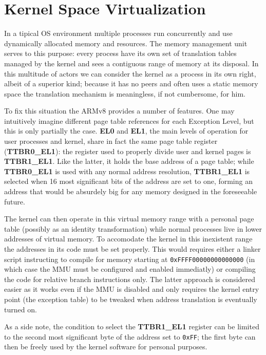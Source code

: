 \documentclass[12pt,a4paper,openright,twoside]{report}
\begin{document}
\section{Kernel Space Virtualization}
\label{kernelvirt}
In a tipical OS environment multiple processes run concurrently and use dynamically
allocated memory and resources. The memory management unit serves to this purpose:
every process have its own set of translation tables managed by the kernel and sees a 
contiguous range of memory at its disposal. In this multitude of actors we can
consider the kernel as a process in its own right, albeit of a superior kind; because
it has no peers and often uses a static memory space the translation mechanism
is meaningless, if not cumbersome, for him.

To fix this situation the ARMv8 provides a number of features. One may intuitively
imagine different page table references for each Exception Level, but this is 
only partially the case. \textbf{EL0} and \textbf{EL1}, the main levels of operation
for user processes and kernel, share in fact the same page table register 
(\textbf{TTBR0\_EL1}): the register used to properly divide user and kernel pages 
is \textbf{TTBR1\_EL1}. Like the latter, it holds the base address of a page table;
while \textbf{TTBR0\_EL1} is used with any normal address resolution,
 \textbf{TTBR1\_EL1} is selected when 16 most significant bits of the address 
 are set to one, forming an address that would be absurdely big for any memory 
 designed in the foreseeable future.

 The kernel can then operate in this virtual memory range with a personal page
 table (possibly as an identity transformation) while normal processes live in 
 lower addresses of virtual memory. To accomodate the kernel in this inexistent
 range the addresses in its code must be set properly. This would requires either
 a linker script instructing to compile for memory starting at 
 {\tt 0xFFFF00000000000000} (in which case the MMU must be configured and 
 enabled immediatly) or compiling the code for relative branch instructions only.
 The latter approach is considered easier as it works even if the MMU is disabled
 and only requires the kernel entry point (the exception table) to be tweaked 
 when address translation is eventually turned on.

 As a side note, the condition to select the \textbf{TTBR1\_EL1} register can
 be limited to the second most significant byte of the address set to {\tt 0xFF};
 the first byte can then be freely used by the kernel software for personal 
 purposes.
\end{document}
